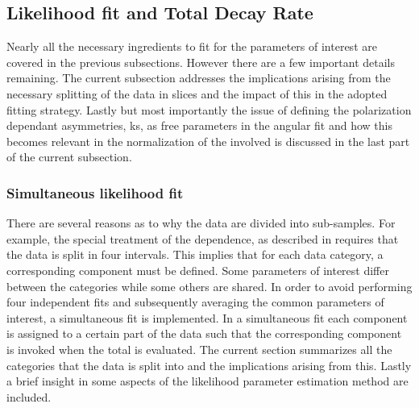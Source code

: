 \subsection{Likelihood fit and Total Decay Rate}
\label{Total_Decay_Rate}

Nearly all the necessary ingredients to fit for the parameters of interest are covered in the previous subsections.
However there are a few important details remaining. The current subsection addresses the
implications arising from the necessary splitting of the data in slices and the impact of this in the adopted
fitting strategy. Lastly but most importantly the issue of defining
the polarization dependant \CP asymmetries, \Acp{k}, as free parameters in the angular fit and how this becomes
relevant in the normalization of the \pdfs involved is discussed in the last part of the current subsection.

\subsubsection{Simultaneous likelihood fit}
\label{Simutaneous_Likelihood_fit}
There are several reasons as to why the data are divided into sub-samples.
For example, the special treatment of the \mkpi dependence, as described in 
requires that the data is split in four \mkpi intervals. This implies that for each data category, a
corresponding component \pdf must be defined. Some parameters of interest differ between the categories
while some others are shared. In order to avoid performing four independent fits and subsequently averaging the common parameters
of interest, a simultaneous fit is implemented. In a simultaneous fit each component \pdf is assigned to a certain part of the data
such that the corresponding component \pdf is invoked when the total \pdf is evaluated. The current section summarizes
all the categories that the data is split into and the implications arising from this. Lastly a brief insight in some aspects
of the likelihood parameter estimation method are included.

